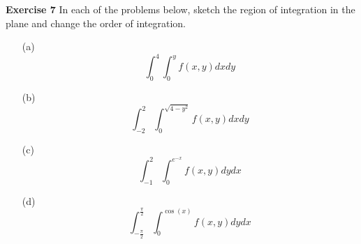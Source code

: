 \documentclass[12pt,oneside]{exam}
\newenvironment{exercise}[1]{\vspace{.1in}\noindent\textbf{Exercise #1 \hspace{.05em}}}{}
\begin{document}
\begin{exercise}{7}
In each of the problems below, sketch the region of integration in the plane and change the order of integration. 
\begin{itemize}
\item[(a)] 
\begin{equation*}
\int_{0}^{4} \int_{0}^{y} f(x,y) dx dy
\end{equation*}
\item[(b)] 
\begin{equation*}
\int_{-2}^{2} \int_{0}^{\sqrt{4-y^2}} f(x,y) dx dy
\end{equation*}
\item[(c)] 
\begin{equation*}
\int_{-1}^{2} \int_{0}^{e^{-x}} f(x,y) dy dx
\end{equation*}
\item[(d)] 
\begin{equation*}
\int_{-\frac{\pi}{2}}^{\frac{\pi}{2}} \int_{0}^{\cos(x)} f(x,y) dy dx
\end{equation*}
\end{itemize}
\end{exercise}
\end{document}
